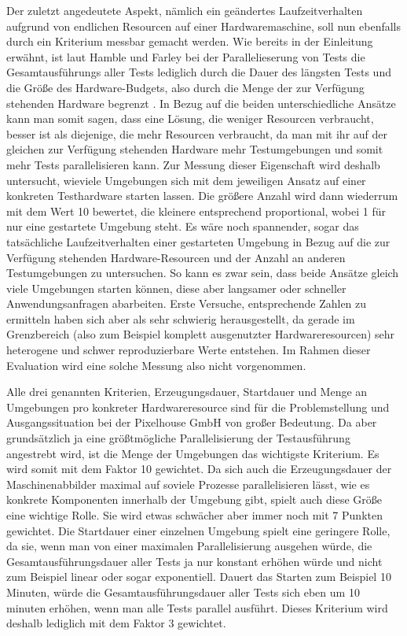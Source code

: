 Der zuletzt angedeutete Aspekt, nämlich ein geändertes Laufzeitverhalten aufgrund von endlichen Resourcen auf einer Hardwaremaschine, soll nun ebenfalls durch ein Kriterium messbar gemacht werden. Wie bereits in der Einleitung erwähnt, ist laut Hamble und Farley bei der Parallelieserung von Tests die Gesamtausführungs aller Tests lediglich durch die Dauer des längsten Tests und die Größe des Hardware-Budgets, also durch die Menge der zur Verfügung stehenden Hardware begrenzt \citep[Vgl.][S. 310]{HumFar10}. In Bezug auf die beiden unterschiedliche Ansätze kann man somit sagen, dass eine Lösung, die weniger Resourcen verbraucht, besser ist als diejenige, die mehr Resourcen verbraucht, da man mit ihr auf der gleichen zur Verfügung stehenden Hardware mehr Testumgebungen und somit mehr Tests parallelisieren kann. Zur Messung dieser Eigenschaft wird deshalb untersucht, wieviele Umgebungen sich mit dem jeweiligen Ansatz auf einer konkreten Testhardware starten lassen. Die größere Anzahl wird dann wiederrum mit dem Wert 10 bewertet, die kleinere entsprechend proportional, wobei 1 für nur eine gestartete Umgebung steht. Es wäre noch spannender, sogar das tatsächliche Laufzeitverhalten einer gestarteten Umgebung in Bezug auf die zur Verfügung stehenden Hardware-Resourcen und der Anzahl an anderen Testumgebungen zu untersuchen. So kann es zwar sein, dass beide Ansätze gleich viele Umgebungen starten können, diese aber langsamer oder schneller Anwendungsanfragen abarbeiten. Erste Versuche, entsprechende Zahlen zu ermitteln haben sich aber als sehr schwierig herausgestellt, da gerade im Grenzbereich (also zum Beispiel komplett ausgenutzter Hardwareresourcen) sehr heterogene und schwer reproduzierbare Werte entstehen. Im Rahmen dieser Evaluation wird eine solche Messung also nicht vorgenommen.

Alle drei genannten Kriterien, Erzeugungsdauer, Startdauer und Menge an Umgebungen pro konkreter Hardwareresource sind für die Problemstellung und Ausgangssituation bei der Pixelhouse GmbH von großer Bedeutung. Da aber grundsätzlich ja eine größtmögliche Parallelisierung der Testausführung angestrebt wird, ist die Menge der Umgebungen das wichtigste Kriterium. Es wird somit mit dem Faktor 10 gewichtet. Da sich auch die Erzeugungsdauer der Maschinenabbilder maximal auf soviele Prozesse parallelisieren lässt, wie es konkrete Komponenten innerhalb der Umgebung gibt, spielt auch diese Größe eine wichtige Rolle. Sie wird etwas schwächer aber immer noch mit 7 Punkten gewichtet. Die Startdauer einer einzelnen Umgebung spielt eine geringere Rolle, da sie, wenn man von einer maximalen Parallelisierung ausgehen würde, die Gesamtausführungsdauer aller Tests ja nur konstant erhöhen würde und nicht zum Beispiel linear oder sogar exponentiell. Dauert das Starten zum Beispiel 10 Minuten, würde die Gesamtausführungsdauer aller Tests sich eben um 10 minuten erhöhen, wenn man alle Tests parallel ausführt. Dieses Kriterium wird deshalb lediglich mit dem Faktor 3 gewichtet.

